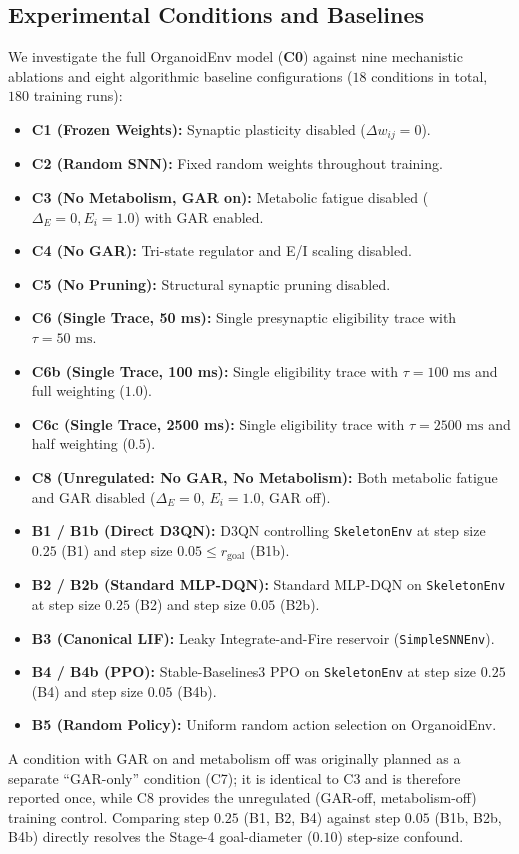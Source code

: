 \documentclass[journal]{IEEEtran}
\begin{document}
\subsection{Experimental Conditions and Baselines}
We investigate the full OrganoidEnv model (\textbf{C0}) against nine mechanistic ablations and eight algorithmic baseline configurations ($18$ conditions in total, $180$ training runs):
\begin{itemize}
    \item \textbf{C1 (Frozen Weights):} Synaptic plasticity disabled ($\Delta w_{ij} = 0$).
    \item \textbf{C2 (Random SNN):} Fixed random weights throughout training.
    \item \textbf{C3 (No Metabolism, GAR on):} Metabolic fatigue disabled ($\Delta_E = 0, E_i = 1.0$) with GAR enabled.
    \item \textbf{C4 (No GAR):} Tri-state regulator and E/I scaling disabled.
    \item \textbf{C5 (No Pruning):} Structural synaptic pruning disabled.
    \item \textbf{C6 (Single Trace, 50 ms):} Single presynaptic eligibility trace with $\tau = 50\text{ ms}$.
    \item \textbf{C6b (Single Trace, 100 ms):} Single eligibility trace with $\tau = 100\text{ ms}$ and full weighting ($1.0$).
    \item \textbf{C6c (Single Trace, 2500 ms):} Single eligibility trace with $\tau = 2500\text{ ms}$ and half weighting ($0.5$).
    \item \textbf{C8 (Unregulated: No GAR, No Metabolism):} Both metabolic fatigue and GAR disabled ($\Delta_E = 0$, $E_i = 1.0$, GAR off).
    \item \textbf{B1 / B1b (Direct D3QN):} D3QN controlling \texttt{SkeletonEnv} at step size $0.25$ (B1) and step size $0.05 \le r_{\mathrm{goal}}$ (B1b).
    \item \textbf{B2 / B2b (Standard MLP-DQN):} Standard MLP-DQN on \texttt{SkeletonEnv} at step size $0.25$ (B2) and step size $0.05$ (B2b).
    \item \textbf{B3 (Canonical LIF):} Leaky Integrate-and-Fire reservoir (\texttt{SimpleSNNEnv}).
    \item \textbf{B4 / B4b (PPO):} Stable-Baselines3 PPO on \texttt{SkeletonEnv} at step size $0.25$ (B4) and step size $0.05$ (B4b).
    \item \textbf{B5 (Random Policy):} Uniform random action selection on OrganoidEnv.
\end{itemize}
A condition with GAR on and metabolism off was originally planned as a separate ``GAR-only'' condition (C7); it is identical to C3 and is therefore reported once, while C8 provides the unregulated (GAR-off, metabolism-off) training control. Comparing step $0.25$ (B1, B2, B4) against step $0.05$ (B1b, B2b, B4b) directly resolves the Stage-4 goal-diameter ($0.10$) step-size confound.
\end{document}
